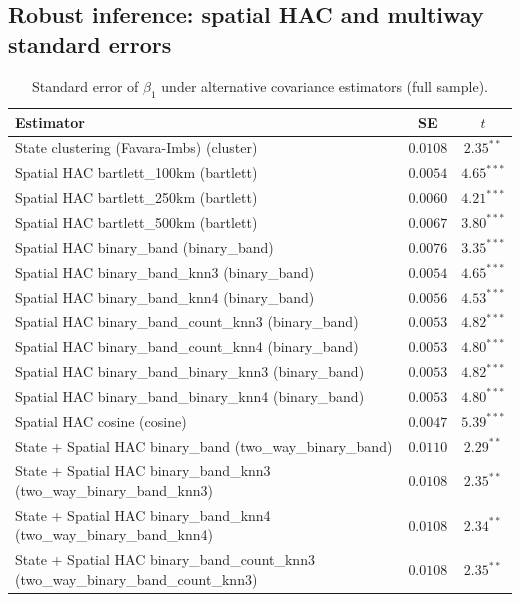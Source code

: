  \clearpage
 
\subsection{Robust inference: spatial HAC and multiway standard errors}
\begin{table}[htbp]
  \centering
  \caption{Standard error of $\hat\beta_1$ under alternative covariance estimators (full sample).}
  \label{tab:conley}
  \small
  \begin{tabular}{lcc}
    \toprule
    Estimator & SE & $t$ \\
    \midrule
    State clustering (Favara-Imbs) (cluster) & $0.0108$ & $2.35^{**}$ \\
    Spatial HAC bartlett\_100km (bartlett) & $0.0054$ & $4.65^{***}$ \\
    Spatial HAC bartlett\_250km (bartlett) & $0.0060$ & $4.21^{***}$ \\
    Spatial HAC bartlett\_500km (bartlett) & $0.0067$ & $3.80^{***}$ \\
    Spatial HAC binary\_band (binary\_band) & $0.0076$ & $3.35^{***}$ \\
    Spatial HAC binary\_band\_knn3 (binary\_band) & $0.0054$ & $4.65^{***}$ \\
    Spatial HAC binary\_band\_knn4 (binary\_band) & $0.0056$ & $4.53^{***}$ \\
    Spatial HAC binary\_band\_count\_knn3 (binary\_band) & $0.0053$ & $4.82^{***}$ \\
    Spatial HAC binary\_band\_count\_knn4 (binary\_band) & $0.0053$ & $4.80^{***}$ \\
    Spatial HAC binary\_band\_binary\_knn3 (binary\_band) & $0.0053$ & $4.82^{***}$ \\
    Spatial HAC binary\_band\_binary\_knn4 (binary\_band) & $0.0053$ & $4.80^{***}$ \\
    Spatial HAC cosine (cosine) & $0.0047$ & $5.39^{***}$ \\
    State + Spatial HAC binary\_band (two\_way\_binary\_band) & $0.0110$ & $2.29^{**}$ \\
    State + Spatial HAC binary\_band\_knn3 (two\_way\_binary\_band\_knn3) & $0.0108$ & $2.35^{**}$ \\
    State + Spatial HAC binary\_band\_knn4 (two\_way\_binary\_band\_knn4) & $0.0108$ & $2.34^{**}$ \\
    State + Spatial HAC binary\_band\_count\_knn3 (two\_way\_binary\_band\_count\_knn3) & $0.0108$ & $2.35^{**}$ \\

\end{tabular}
\end{table}
